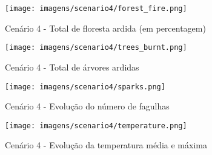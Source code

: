 \begin{figure}[H]
    \centering
    \texttt{[image: imagens/scenario4/forest\_fire.png]}
    \caption{Cenário 4 - Total de floresta ardida (em percentagem)}
    \label{fig:S4ForestBurnt}
\end{figure}

\begin{figure}[H]
    \centering
    \texttt{[image: imagens/scenario4/trees\_burnt.png]}
    \caption{Cenário 4 - Total de árvores ardidas}
    \label{fig:S4TreesBurnt}
\end{figure}

\begin{figure}[H]
    \centering
    \texttt{[image: imagens/scenario4/sparks.png]}
    \caption{Cenário 4 - Evolução do número de fagulhas}
    \label{fig:S4Sparks}
\end{figure}

\begin{figure}[H]
    \centering
    \texttt{[image: imagens/scenario4/temperature.png]}
    \caption{Cenário 4 - Evolução da temperatura média e máxima}
    \label{fig:S4Temp}
\end{figure}